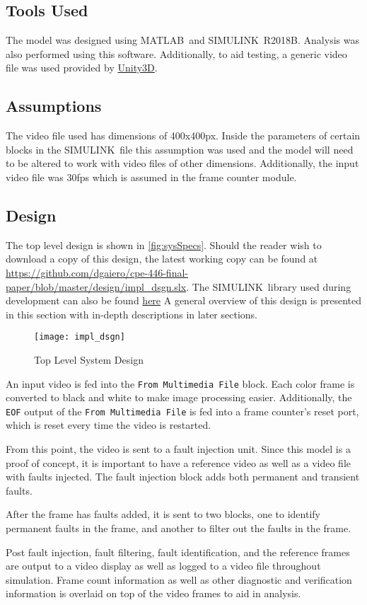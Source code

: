 \subsection{Tools Used}
The model was designed using MATLAB\textregisteredmark\ and SIMULINK\textregisteredmark\ R2018B. Analysis was also performed using this software. Additionally, to aid testing, a generic video file was used provided by \hyperlink{https://blogs.unity3d.com/2016/11/28/free-vfx-image-sequences-flipbooks/}{Unity3D}.
\subsection{Assumptions}
The video file used has dimensions of 400x400px. Inside the parameters of certain blocks in the SIMULINK\textregisteredmark\ file this assumption was used and the model will need to be altered to work with video files of other dimensions. Additionally, the input video file was 30fps which is assumed in the frame counter module.
\subsection{Design}
The top level design is shown in \autoref{fig:sysSpecs}. Should the reader wish to download a copy of this design, the latest working copy can be found at \hyperlink{https://github.com/dgaiero/cpe-446-final-paper/blob/master/design/impl_dsgn.slx}{https://github.com/dgaiero/cpe-446-final-paper/blob/master/design/impl\_dsgn.slx}. The SIMULINK\textregisteredmark\ library used during development can also be found \hyperlink{https://github.com/dgaiero/cpe-446-final-paper/blob/master/design/library.slx}{here} A general overview of this design is presented in this section with in-depth descriptions in later sections.
\begin{figure*}
    \texttt{[image: impl\_dsgn]}
    \caption{Top Level System Design}
    \label{fig:sysSpecs}
\end{figure*}
\par An input video is fed into the \verb!From Multimedia File! block. Each color frame is converted to black and white to make image processing easier. Additionally, the \verb!EOF! output of the \verb!From Multimedia File! is fed into a frame counter's reset port, which is reset every time the video is restarted.
\par From this point, the video is sent to a fault injection unit. Since this model is a proof of concept, it is important to have a reference video as well as a video file with faults injected. The fault injection block adds both permanent and transient faults.
\par After the frame has faults added, it is sent to two blocks, one to identify permanent faults in the frame, and another to filter out the faults in the frame.
\par Post fault injection, fault filtering, fault identification, and the reference frames are output to a video display as well as logged to a video file throughout simulation. Frame count information as well as other diagnostic and verification information is overlaid on top of the video frames to aid in analysis.

